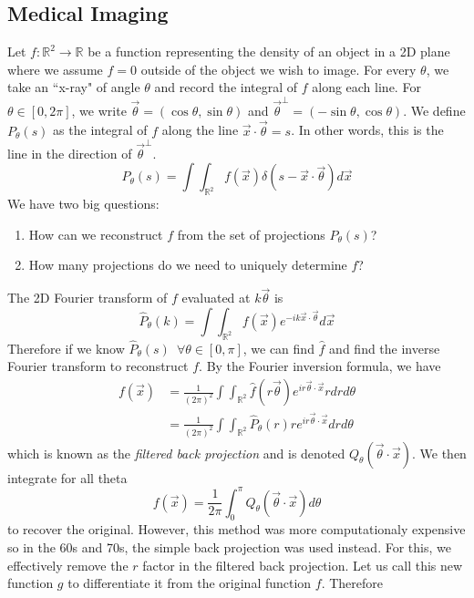 \documentclass{article}
\newcommand{\R}{\mathbb{R}}
\newcommand{\pull}{\!\!\!}
\theoremstyle{definition}
\begin{document}
\subsection{Medical Imaging}
Let $f: \R^2 \to \R$ be a function representing the density of an object in a 2D plane where we assume $f=0$ outside of the object we wish to image. For every $\theta$, we take an ``x-ray" of angle $\theta$ and record the integral of $f$ along each line. For $\theta \in [0,2\pi]$, we write $\vec \theta = (\cos \theta, \sin \theta)$ and $\vec \theta^\perp = (-\sin \theta, \cos \theta)$. We define $P_\theta (s)$ as the integral of $f$ along the line $\vec x \cdot \vec \theta = s$. In other words, this is the line in the direction of $\vec \theta^\perp$. 
\begin{equation*}
    P_\theta (s) = \int \pull \int _{\R^2} f(\vec x) \delta (s-\vec x \cdot \vec \theta ) d{\vec x}
\end{equation*}
We have two big questions:
\begin{enumerate}
    \item How can we reconstruct $f$ from the set of projections $P_\theta (s)$?
    \item How many projections do we need to uniquely determine $f$?
\end{enumerate}
The 2D Fourier transform of $f$ evaluated at $k\vec \theta$ is 
\begin{equation*}
    \hat P_\theta (k) = \int \pull \int_{\R^2} f(\vec x) e^{-i k \vec x \cdot \vec \theta} d{\vec x}
\end{equation*}
Therefore if we know $\hat P_\theta (s) \,\,\, \forall \theta \in [0,\pi]$, we can find $\hat f$ and find the inverse Fourier transform to reconstruct $f$. By the Fourier inversion formula, we have 
\begin{align*}
    f(\vec x) &= \frac{1}{(2\pi)^2} \int \pull \int_{\R^2} \hat f(r\vec \theta) e^{i r\vec \theta \cdot \vec x} rdr d\theta \\
    &= \frac{1}{(2\pi)^2} \int \pull \int_{\R^2} \hat P_\theta (r) re^{i r\vec \theta \cdot \vec x} dr d\theta
\end{align*}
which is known as the \emph{filtered back projection} and is denoted $Q_\theta (\vec \theta \cdot \vec x)$. We then integrate for all theta 
\begin{equation*}
    f(\vec x) = \frac{1}{2\pi} \int_0^\pi Q_\theta (\vec \theta \cdot \vec x) d\theta
\end{equation*}
to recover the original. However, this method was more computationaly expensive so in the 60s and 70s, the simple back projection was used instead. For this, we effectively remove the $r$ factor in the filtered back projection. Let us call this new function $g$ to differentiate it from the original function $f$. Therefore 
\end{document}

